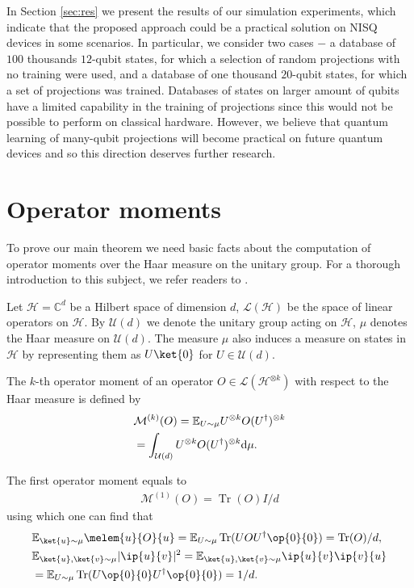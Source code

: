 \documentclass[pra,twocolumn,superscriptaddress,longbibliography]{revtex4-2}
\theoremstyle{remark}
\newcommand{\mcl}{\mathcal}
\newcommand{\mbb}{\mathbb}
\DeclareMathOperator{\tr}{Tr}
\numberwithin{equation}{section}
\begin{document}
In Section \ref{sec:res} we present the results of our simulation experiments, 
which indicate that the proposed approach could be a practical solution on NISQ devices in some scenarios. 
In particular, we consider two cases $-$ a database of $100$ thousands $12$-qubit states, 
for which a selection of random projections with no training were used, 
and a database of one thousand $20$-qubit states, for which a set of projections was trained. 
Databases of states on larger amount of qubits have a limited capability in the training of projections since this would not be possible to perform on classical hardware. 
However, we believe that quantum learning of many-qubit projections will become practical on future quantum devices and so this direction deserves further research.

\section{Operator moments}\label{sec:pre}

To prove our main theorem we need basic facts about the computation of operator moments over the Haar measure on the unitary group. 
For a thorough introduction to this subject, we refer readers to \cite{Mele2024}.

Let $\mcl{H} = \mbb{C}^d$ be a Hilbert space of dimension $d$, 
$\mcl{L}(\mcl{H})$ be the space of linear operators on $\mcl{H}$. 
By $\mcl{U}(d)$ we denote the unitary group acting on $\mcl{H}$, 
$\mu$ denotes the Haar measure on $\mcl{U}(d)$. 
The measure $\mu$ also induces a measure on states in $\mcl{H}$ 
by representing them as $U\ket{0}$ for $U \in \mcl{U}(d)$. 

The $k$-th operator moment of an operator $O \in \mcl{L}(\mcl{H}^{\otimes k})$ with respect to the Haar measure is defined by 
\begin{align}
    & \mcl{M}^{(k)}(O) = \mbb{E}_{U \sim \mu} U^{\otimes k}O(U^\dagger)^{\otimes k} \\
    & = \int_{\mcl{U}(d)} U^{\otimes k}O(U^\dagger)^{\otimes k} {\rm d} \mu.
\end{align}

The first operator moment equals to
\begin{align}
\mcl{M}^{(1)}(O) = \tr(O)I/d 
\end{align}
using which one can find that 
\begin{align*}
    & {\mbb{E}}_{\ket{u} \sim \mu} \melem{u}{O}{u}
    = {\mbb{E}}_{U \sim \mu} \tr(UOU^\dagger \op{0}{0})
    = \tr(O)/d, \\
    & {\mbb{E}}_{\ket{u},\ket{v} \sim \mu} |\ip{u}{v}|^2 
    = {\mbb{E}}_{\ket{u},\ket{v} \sim \mu} \ip{u}{v}\ip{v}{u} \\
    & = {\mbb{E}}_{U \sim \mu} \tr(U\op{0}{0}U^\dagger\op{0}{0})
    = 1/d. 
\end{align*}
\end{document}
